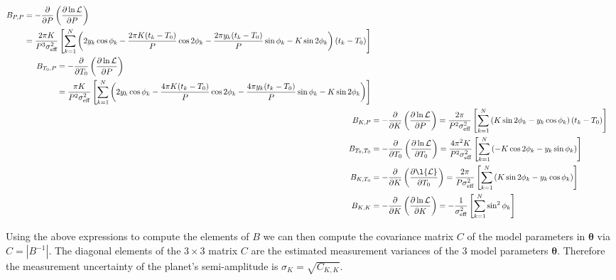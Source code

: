\begin{align}
  \begin{split}
    B_{P,P} &= -\frac{\partial}{\partial P} \left( \frac{\partial \ln{\mathcal{L}}}{\partial P} \right) \\
    &= \frac{2\pi K}{P^3 \sigma_{\text{eff}}^2} \left[ \sum_{k=1}^{N} \left( 2y_k \cos{\phi_k}
      - \frac{2\pi K (t_k-T_0)}{P}\cos{2\phi_k} -\frac{2\pi y_k (t_k-T_0)}{P} \sin{\phi_k} -K \sin{2\phi_k} \right) (t_k-T_0) \right]
  \end{split} \\
  \begin{split}
    B_{T_0,P} &= -\frac{\partial}{\partial T_0} \left( \frac{\partial \ln{\mathcal{L}}}{\partial P} \right) \\
    &= \frac{\pi K}{P^2 \sigma_{\text{eff}}^2} \left[ \sum_{k=1}^{N} \left( 2y_k \cos{\phi_k}
      -\frac{4\pi K (t_k-T_0)}{P} \cos{2\phi_k} -\frac{4\pi y_k (t_k-T_0)}{P} \sin{\phi_k} - K \sin{2\phi_k}  \right) \right]
  \end{split} \\
  B_{K,P} &= -\frac{\partial}{\partial K} \left( \frac{\partial \ln{\mathcal{L}}}{\partial P} \right)
  = \frac{2\pi}{P^2 \sigma_{\text{eff}}^2} \left[ \sum_{k=1}^{N} \left( K\sin{2\phi_k} -y_k\cos{\phi_k} \right) (t_k-T_0) \right] \\
  B_{T_0,T_0} &= -\frac{\partial}{\partial T_0} \left( \frac{\partial \ln{\mathcal{L}}}{\partial T_0} \right)
  = \frac{4\pi^2 K}{P^2 \sigma_{\text{eff}}^2} \left[ \sum_{k=1}^{N} \left( -K\cos{2\phi_k} - y_k \sin{\phi_k} \right) \right] \\
  B_{K,T_0} &= -\frac{\partial}{\partial K} \left( \frac{\partial \l{\mathcal{L}}}{\partial T_0} \right)
  = \frac{2\pi}{P \sigma_{\text{eff}}^2} \left[ \sum_{k=1}^{N} \left( K \sin{2\phi_k} -y_k\cos{\phi_k}  \right) \right] \\
  B_{K,K} &= -\frac{\partial}{\partial K} \left( \frac{\partial \ln{\mathcal{L}}}{\partial K} \right)
  = -\frac{1}{\sigma_{\text{eff}}^2} \left[ \sum_{k=1}^{N} \sin^2{\phi_k} \right] 
\end{align}

Using the above expressions to compute the elements of $B$ we can then compute the covariance matrix $C$ of the model
parameters in $\boldsymbol{\theta}$ via $C=|B^{-1}|$. The diagonal elements of the $3 \times 3$ matrix $C$ are the
estimated measurement variances of the 3 model parameters $\boldsymbol{\theta}$. Therefore the measurement uncertainty of
the planet's semi-amplitude is $\sigma_{K} = \sqrt{C_{K,K}}$. 



